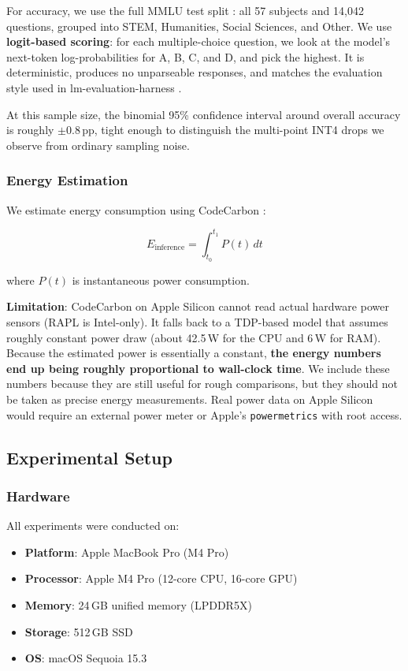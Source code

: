 \documentclass[journal]{IEEEtran}
\begin{document}
For accuracy, we use the full MMLU test split \cite{hendrycks2021mmlu}: all 57 subjects and 14,042 questions, grouped into STEM, Humanities, Social Sciences, and Other. We use \textbf{logit-based scoring}: for each multiple-choice question, we look at the model's next-token log-probabilities for A, B, C, and D, and pick the highest. It is deterministic, produces no unparseable responses, and matches the evaluation style used in lm-evaluation-harness \cite{eval-harness}.

At this sample size, the binomial 95\% confidence interval around overall accuracy is roughly $\pm 0.8$\,pp, tight enough to distinguish the multi-point INT4 drops we observe from ordinary sampling noise.

\subsubsection{Energy Estimation}
\label{sec:energy_method}

We estimate energy consumption using CodeCarbon \cite{codecarbon2023}:

\begin{equation}
E_{\text{inference}} = \int_{t_0}^{t_1} P(t) \, dt
\end{equation}

where $P(t)$ is instantaneous power consumption.

\textbf{Limitation}: CodeCarbon on Apple Silicon cannot read actual hardware power sensors (RAPL is Intel-only). It falls back to a TDP-based model that assumes roughly constant power draw (about 42.5\,W for the CPU and 6\,W for RAM). Because the estimated power is essentially a constant, \textbf{the energy numbers end up being roughly proportional to wall-clock time}. We include these numbers because they are still useful for rough comparisons, but they should not be taken as precise energy measurements. Real power data on Apple Silicon would require an external power meter or Apple's \texttt{powermetrics} with root access.

\subsection{Experimental Setup}

\subsubsection{Hardware}
\label{sec:hw-setup}

All experiments were conducted on:
\begin{itemize}[leftmargin=*,nosep]
    \item \textbf{Platform}: Apple MacBook Pro (M4 Pro)
    \item \textbf{Processor}: Apple M4 Pro (12-core CPU, 16-core GPU)
    \item \textbf{Memory}: 24\,GB unified memory (LPDDR5X)
    \item \textbf{Storage}: 512\,GB SSD
    \item \textbf{OS}: macOS Sequoia 15.3
\end{itemize}
\end{document}

